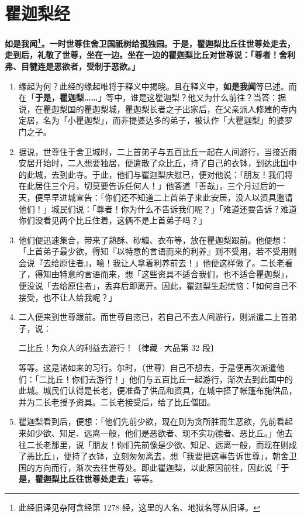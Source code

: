 \section{瞿迦梨经}

\textbf{如是我闻\footnote{此经旧译见杂阿含经第 1278 经，这里的人名、地狱名等从旧译。}。一时世尊住舍卫国祇树给孤独园。于是，瞿迦梨比丘往世尊处走去，走到后，礼敬了世尊，坐在一边。坐在一边的瞿迦梨比丘对世尊说：「尊者！舍利弗、目犍连是恶欲者，受制于恶欲。」}

\begin{enumerate}\item 缘起为何？此经的缘起唯将于释义中揭晓。且在释义中，\textbf{如是我闻}等已述。而在「\textbf{于是，瞿迦梨……}」等中，谁是这瞿迦梨？他又为什么前往？当答：据说，在瞿迦梨国的瞿迦梨城，瞿迦梨长者之子出家后，在父亲派人修建的寺内定居，名为「小瞿迦梨」，而非提婆达多的弟子，被认作「大瞿迦梨」的婆罗门之子。
\item 据说，世尊住于舍卫城时，二上首弟子与五百比丘一起在人间游行，当接近雨安居开始时，二人想要独居，便遣散了众比丘，持了自己的衣钵，到达此国中的此城，去到此寺。于此，他们与瞿迦梨庆慰已，便对他说：「朋友！我们将在此居住三个月，切莫要告诉任何人！」他答道「善哉」，三个月过后的一天，便早早进城宣告：「你们还不知道二上首弟子来此安居，没人以资具邀请他们！」城民们说：「尊者！你为什么不告诉我们呢？」「难道还要告诉？难道你们没看见两个比丘住着，这俩不是上首弟子吗？」
\item 他们便迅速集合，带来了熟酥、砂糖、衣布等，放在瞿迦梨跟前。他便想：「上首弟子最少欲，得知『以特意的言语而来的利养』则不受用，若不受用则会说『去给原住者』，噫！我让人拿着利养前去！」他便这样做了。二长老看了，得知由特意的言语而来，想「这些资具不适合我们，也不适合瞿迦梨」，便没说「去给原住者」，丢弃后即离开。因此，瞿迦梨生起忧恼：「如何自己不接受，也不让人给我呢？」
\item 二人便来到世尊跟前。而世尊自恣已，若自己不去人间游行，则派遣二上首弟子，说：\begin{quoting}二比丘！为众人的利益去游行！{\bluefootnotesize 〔律藏·大品第 32 段〕}\end{quoting}等等。这是诸如来的习行。尔时，（世尊）自己不想去，于是便再次派遣他们：「二比丘！你们去游行！」他们与五百比丘一起游行，渐次去到此国中的此城。城民们认得是长老，便准备了供品和资具，在城中搭了帐篷布施供品，并为二长老授予资具。二长老接受后，给了比丘僧团。
\item 瞿迦梨看到后，便想：「他们先前少欲，现在则为贪所胜而生恶欲，先前看起来如少欲、知足、远离一般，他们是恶欲者、现不实功德者、恶比丘。」他去往二长老那里，说「朋友！你们先前像是少欲、知足、远离一般，而现在则成了恶比丘」，便持了衣钵，立刻匆匆离去，想「我要把这事告诉世尊」，朝舍卫国的方向而行，渐次去往世尊处。即此瞿迦梨，以此原因前往，因此说「\textbf{于是，瞿迦梨比丘往世尊处走去}」等等。\end{enumerate}

